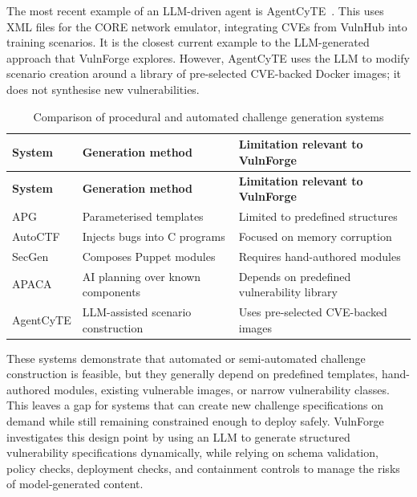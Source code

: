 The most recent example of an LLM-driven agent is AgentCyTE~\citep{rodriguez_agentcyte_2025}. This uses XML files for the CORE network emulator, integrating CVEs from VulnHub into training scenarios. It is the closest current example to the LLM-generated approach that VulnForge explores. However, AgentCyTE uses the LLM to modify scenario creation around a library of pre-selected CVE-backed Docker images; it does not synthesise new vulnerabilities.

\begin{longtable}{|p{}|p{}|p{}|}
	\caption{Comparison of procedural and automated challenge generation systems}
	\label{tab:procedural-generation-comparison}                                                       \\
	\hline
	\textbf{System} & \textbf{Generation method}         & \textbf{Limitation relevant to VulnForge}   \\
	\hline
	\endfirsthead
	\hline
	\textbf{System} & \textbf{Generation method}         & \textbf{Limitation relevant to VulnForge}   \\
	\hline
	\endhead
	APG             & Parameterised templates            & Limited to predefined structures            \\
	\hline
	AutoCTF         & Injects bugs into C programs       & Focused on memory corruption                \\
	\hline
	SecGen          & Composes Puppet modules            & Requires hand-authored modules              \\
	\hline
	APACA           & AI planning over known components  & Depends on predefined vulnerability library \\
	\hline
	AgentCyTE       & LLM-assisted scenario construction & Uses pre-selected CVE-backed images         \\
	\hline
\end{longtable}

These systems demonstrate that automated or semi-automated challenge construction is feasible, but they generally depend on predefined templates, hand-authored modules, existing vulnerable images, or narrow vulnerability classes. This leaves a gap for systems that can create new challenge specifications on demand while still remaining constrained enough to deploy safely. VulnForge investigates this design point by using an LLM to generate structured vulnerability specifications dynamically, while relying on schema validation, policy checks, deployment checks, and containment controls to manage the risks of model-generated content.

